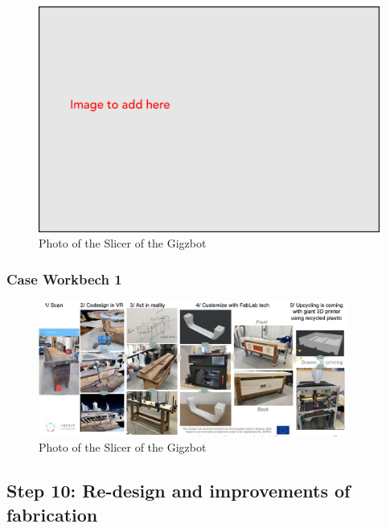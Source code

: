 \documentclass[
  11pt,
]{article}
\begin{document}
\begin{figure}[H]

{\centering \includegraphics[width=5.20833in,height=\textheight]{figures/Image-to-add.png}

}

\caption{Photo of the Slicer of the Gigzbot}

\end{figure}

\hypertarget{case-workbech-1-1}{%
\subsubsection{Case Workbech 1}\label{case-workbech-1-1}}

\begin{figure}[H]

{\centering \includegraphics[width=0.9\textwidth,height=\textheight]{figures/demos/workbench/2022-02-24 Processus INEDIT.png}

}

\caption{Photo of the Slicer of the Gigzbot}

\end{figure}

\hypertarget{step-10-re-design-and-improvements-of-fabrication}{%
\subsection{Step 10: Re-design and improvements of
fabrication}\label{step-10-re-design-and-improvements-of-fabrication}}
\end{document}
